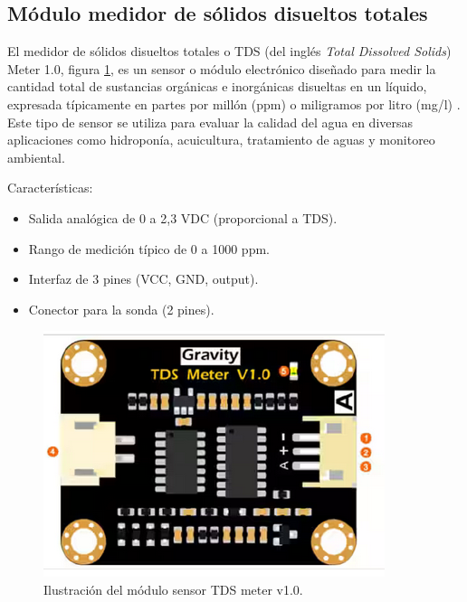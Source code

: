 
\subsection{Módulo medidor de sólidos disueltos totales}

El medidor de sólidos disueltos totales o TDS (del inglés \textit{Total Dissolved Solids}) Meter 1.0, figura \ref{fig:tds}, es un sensor o módulo electrónico diseñado para medir la cantidad total de sustancias orgánicas e inorgánicas disueltas en un líquido, expresada típicamente en partes por millón (ppm) o miligramos por litro (mg/l) \cite{TDS}. Este tipo de sensor se utiliza para evaluar la calidad del agua en diversas aplicaciones como hidroponía, acuicultura, tratamiento de aguas y monitoreo ambiental.

Características:

\begin{itemize}
	\item Salida analógica de 0 a 2,3 VDC (proporcional a TDS).
	\item Rango de medición típico de 0 a 1000 ppm.
	\item Interfaz de 3 pines (VCC, GND, output).
	\item Conector para la sonda (2 pines).
\end{itemize}


\begin{figure}[h]
\centering
\includegraphics[scale=.5]{./Figures/tds.png}
	\caption{Ilustración del módulo sensor TDS meter v1.0\protect\footnotemark.}
	\label{fig:tds}
\end{figure}

